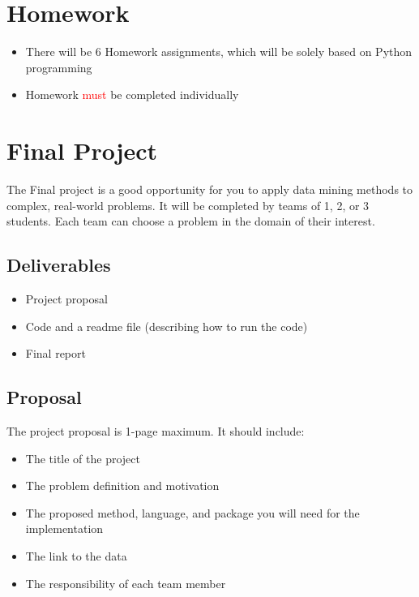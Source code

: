 \documentclass[pdftex,11pt]{artikel3}
\begin{document}
\section{Homework}
\begin{itemize}
\item There will be 6 Homework assignments, which will be solely based on Python programming
\item Homework \textcolor{red}{must} be completed individually
\end{itemize}

\section{Final Project}
The Final project is a good opportunity for you to apply data mining methods to complex, real-world problems. It will be completed by teams of 1, 2, or 3 students. Each team can choose a problem in the domain of their interest.

\subsection{Deliverables}
\begin{itemize}
\item Project proposal
\item Code and a readme file (describing how to run the code)
\item Final report
\end{itemize}

\subsection{Proposal}
The project proposal is 1-page maximum. It should include:
\begin{itemize}
\item The title of the project
\item The problem definition and motivation
\item The proposed method, language, and package you will need for the implementation
\item The link to the data
\item The responsibility of each team member
\end{itemize}
\end{document}
